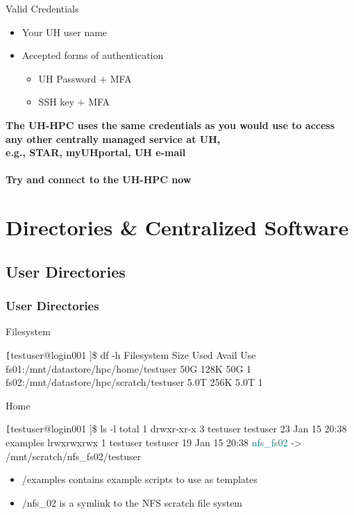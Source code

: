\begin{frame}
\begin{block}{Valid Credentials}
		\begin{itemize}
			\item Your UH user name
			\item Accepted forms of authentication
			\begin{itemize}\scriptsize
				\item UH Password $+$ MFA 
				\item SSH key $+$ MFA
			\end{itemize}
		\end{itemize}
	\end{block}
	\begin{center}\scriptsize
	\textbf{The UH-HPC uses the same credentials as you would use to access any other centrally managed service at UH,\\e.g., STAR, myUHportal, UH e-mail\\~\\Try and connect to the UH-HPC now}
	\end{center}
\end{frame}

 
\section[Directories \& Centralized Software]{Directories \& Centralized Software }
\subsection{User Directories}
\begin{frame}[fragile]
\frametitle{User Directories}
\begin{block}{Filesystem}
\begin{semiverbatim}\tiny \texttt
[testuser@login001 \ctilde]\$ df -h
Filesystem                                   Size  Used Avail Use%
fs01:/mnt/datastore/hpc/home/testuser         50G  128K   50G   1%
fs02:/mnt/datastore/hpc/scratch/testuser     5.0T  256K  5.0T   1%
\end{semiverbatim}
\end{block}
\begin{block}{Home}
\begin{semiverbatim}\tiny \texttt
[testuser@login001 \ctilde]\$ ls -l 
total 1
drwxr-xr-x 3 testuser testuser 23 Jan 15 20:38 examples
lrwxrwxrwx 1 testuser testuser 19 Jan 15 20:38 \textcolor{teal}{nfs_fs02} -> /mnt/scratch/nfs_fs02/testuser
\end{semiverbatim}
\end{block}
\begin{itemize}
		\item \ctilde{}/examples contains example scripts to use as templates
		\item \ctilde{}/nfs\_02 is a symlink to the NFS scratch file system
\end{itemize}
\end{frame}


